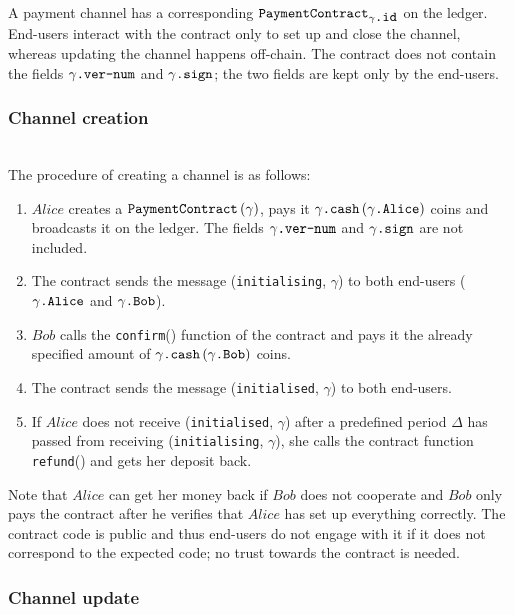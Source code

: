    A payment channel has a corresponding
    $\mbox{\texttt{PaymentContract}}_{\gamma\mbox{\texttt{.id}}}$ on the ledger. End-users
    interact with the contract only to set up and close the channel, whereas updating the
    channel happens off-chain. The contract does not contain the fields
    $\gamma\mbox{\texttt{.ver-num}}$ and $\gamma\mbox{\texttt{.sign}}$; the two fields are
    kept only by the end-users.

    \subsubsection{Channel creation} \ \\

    The procedure of creating a channel is as follows:
    \begin{enumerate}
      \item $Alice$ creates a $\mbox{\texttt{PaymentContract}}\left(\gamma\right)$, pays
      it $\gamma\mbox{\texttt{.cash}}\left(\gamma\mbox{\texttt{.Alice}}\right)$ coins and
      broadcasts it on the ledger. The fields $\gamma\mbox{\texttt{.ver-num}}$ and
      $\gamma\mbox{\texttt{.sign}}$ are not included.
      \item The contract sends the message (\texttt{initialising}, $\gamma$) to both
      end-users ($\gamma\mbox{\texttt{.Alice}}$ and $\gamma\mbox{\texttt{.Bob}}$).
      \item $Bob$ calls the \texttt{confirm}() function of the contract and pays it the
      already specified amount of
      $\gamma\mbox{\texttt{.cash}}\left(\gamma\mbox{\texttt{.Bob}}\right)$ coins.
      \item The contract sends the message (\texttt{initialised}, $\gamma$) to both
      end-users.
      \item If $Alice$ does not receive (\texttt{initialised}, $\gamma$) after a
      predefined period $\Delta$ has passed from receiving (\texttt{initialising},
      $\gamma$), she calls the contract function \texttt{refund}() and gets her deposit
      back.
    \end{enumerate}

    Note that $Alice$ can get her money back if $Bob$ does not cooperate and $Bob$ only
    pays the contract after he verifies that $Alice$ has set up everything correctly. The
    contract code is public and thus end-users do not engage with it if it does not
    correspond to the expected code; no trust towards the contract is needed.

    \subsubsection{Channel update} \ \\

